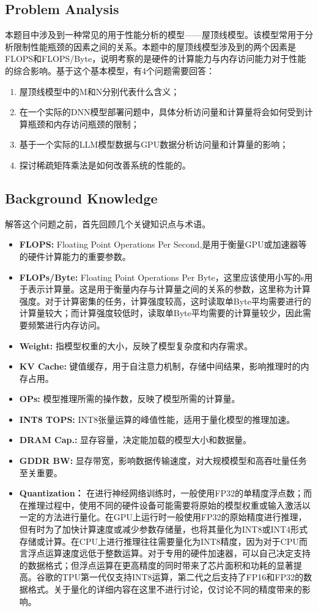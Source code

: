 \documentclass[11pt, a4 paper]{article}
\begin{document}
\subsection{Problem Analysis}
本题目中涉及到一种常见的用于性能分析的模型——屋顶线模型。该模型常用于分析限制性能瓶颈的因素之间的关系。本题中的屋顶线模型涉及到的两个因素是FLOPS和FLOPS/Byte，说明考察的是硬件的计算能力与内存访问能力对于性能的综合影响。基于这个基本模型，有4个问题需要回答：
\begin{enumerate}[nosep]
    \item 屋顶线模型中的M和N分别代表什么含义；
    \item 在一个实际的DNN模型部署问题中，具体分析访问量和计算量将会如何受到计算瓶颈和内存访问瓶颈的限制；
    \item 基于一个实际的LLM模型数据与GPU数据分析访问量和计算量的影响；
    \item 探讨稀疏矩阵乘法是如何改善系统的性能的。
\end{enumerate}
\subsection{Background Knowledge}
解答这个问题之前，首先回顾几个关键知识点与术语。
\begin{itemize}
    \item \textbf{FLOPS:} Floating Point Operations Per Second,是用于衡量GPU或加速器等的硬件计算能力的重要参数。
    \item \textbf{FLOPs/Byte:} Floating Point Operations Per Byte，这里应该使用小写的s用于表示计算量。这是用于衡量内存与计算量之间的关系的参数，这里称为计算强度。对于计算密集的任务，计算强度较高，这时读取单Byte平均需要进行的计算量较大；而计算强度较低时，读取单Byte平均需要的计算量较少，因此需要频繁进行内存访问。
    \item \textbf{Weight:} 指模型权重的大小，反映了模型复杂度和内存需求。
    \item \textbf{KV Cache:} 键值缓存，用于自注意力机制，存储中间结果，影响推理时的内存占用。
    \item \textbf{OPs:} 模型推理所需的操作数，反映了模型所需的计算量。
    \item \textbf{INT8 TOPS:} INT8张量运算的峰值性能，适用于量化模型的推理加速。
    \item \textbf{DRAM Cap.:} 显存容量，决定能加载的模型大小和数据量。
    \item \textbf{GDDR BW:} 显存带宽，影响数据传输速度，对大规模模型和高吞吐量任务至关重要。
    \item \textbf{Quantization：} 在进行神经网络训练时，一般使用FP32的单精度浮点数；而在推理过程中，使用不同的硬件设备可能需要将原始的模型权重或输入激活以一定的方法进行量化。在GPU上运行时一般使用FP32的原始精度进行推理，但有时为了加快计算速度或减少参数存储量，也将其量化为INT8或INT4形式存储或计算。在CPU上进行推理往往需要量化为INT8精度，因为对于CPU而言浮点运算速度远低于整数运算。对于专用的硬件加速器，可以自己决定支持的数据格式；但浮点运算在更高精度的同时带来了芯片面积和功耗的显著提高。谷歌的TPU第一代仅支持INT8运算，第二代之后支持了FP16和FP32的数据格式。关于量化的详细内容在这里不进行讨论，仅讨论不同的精度带来的影响。
    
\end{itemize}
\end{document}
